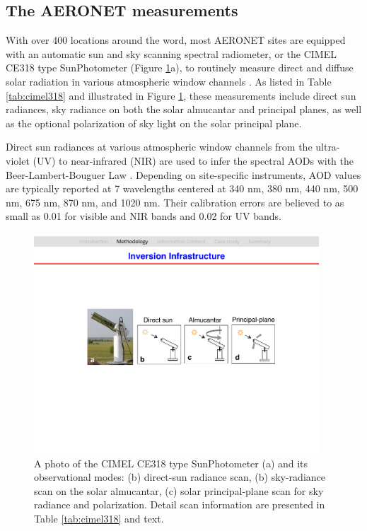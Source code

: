 \subsection{The AERONET measurements} \label{subsec:cimel318}

With over 400 locations around the word, most AERONET sites are equipped with
an automatic sun and sky scanning spectral radiometer, or the CIMEL CE318 type
SunPhotometer (Figure \ref{fig:cimel318}a), to routinely measure direct and 
diffuse solar radiation in various atmospheric window channels \citep{Holben98}. 
As listed in Table \ref{tab:cimel318} and illustrated in Figure 
\ref{fig:cimel318}, these measurements include direct sun radiances, sky 
radiance on both the solar almucantar and principal planes, as well as the 
optional polarization of sky light on the solar principal plane.

Direct sun radiances at various atmospheric window channels from the
ultra-violet (UV) to near-infrared (NIR) are used to infer the spectral AODs with the
Beer-Lambert-Bouguer Law \citep{Holben98,Smirnov00}. Depending on site-specific
instruments, AOD values are typically reported at 7 wavelengths centered at 340
nm, 380 nm, 440 nm, 500 nm, 675 nm, 870 nm, and 1020 nm. Their calibration
errors are believed to as small as 0.01 for visible and NIR bands and 0.02 for
UV bands.

\begin{figure}[t]
  \centering
  \includegraphics[width={0.95\textwidth}]{figures/cimel318.pdf}
  \caption[Photo of a CIMEL CE318 Sun photometer and its observational
modes.]{A photo of the CIMEL CE318 type SunPhotometer (a) and its 
observational modes: (b) direct-sun radiance scan, (b) sky-radiance scan
on the solar almucantar, (c) solar principal-plane scan for sky radiance
and polarization. Detail scan information are presented in Table
\ref{tab:cimel318} and text.}
  \label{fig:cimel318}
\end{figure}

